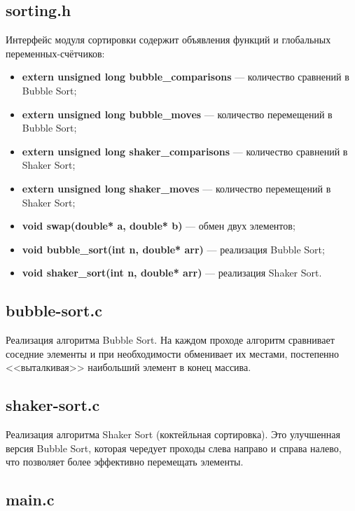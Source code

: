 \documentclass[a4paper,12pt,titlepage]{article}
\begin{document}
\subsection{sorting.h}

Интерфейс модуля сортировки содержит объявления функций и глобальных переменных-счётчиков:

\begin{itemize}
    \item \textbf{extern unsigned long bubble\_comparisons} --- количество сравнений в Bubble Sort;
    \item \textbf{extern unsigned long bubble\_moves} --- количество перемещений в Bubble Sort;
    \item \textbf{extern unsigned long shaker\_comparisons} --- количество сравнений в Shaker Sort;
    \item \textbf{extern unsigned long shaker\_moves} --- количество перемещений в Shaker Sort;
    \item \textbf{void swap(double* a, double* b)} --- обмен двух элементов;
    \item \textbf{void bubble\_sort(int n, double* arr)} --- реализация Bubble Sort;
    \item \textbf{void shaker\_sort(int n, double* arr)} --- реализация Shaker Sort.
\end{itemize}

\subsection{bubble-sort.c}

Реализация алгоритма Bubble Sort. На каждом проходе алгоритм сравнивает соседние элементы и при необходимости обменивает их местами, постепенно <<выталкивая>> наибольший элемент в конец массива.

\subsection{shaker-sort.c}

Реализация алгоритма Shaker Sort (коктейльная сортировка). Это улучшенная версия Bubble Sort, которая чередует проходы слева направо и справа налево, что позволяет более эффективно перемещать элементы.

\subsection{main.c}
\end{document}
